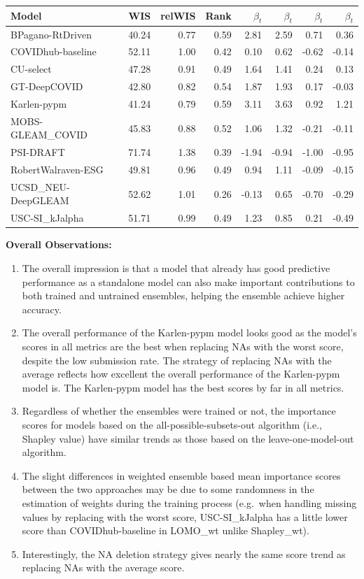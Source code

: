 \documentclass[
]{article}
\begin{document}
\begin{tabular}{l|r|r|r|r|r|r|r}
\hline
Model & WIS & relWIS & Rank & $\beta_t$ & $\beta_t$ & $\beta_t$ & $\beta_t$\\
\hline
BPagano-RtDriven & 40.24 & 0.77 & 0.59 & 2.81 & 2.59 & 0.71 & 0.36\\
\hline
COVIDhub-baseline & 52.11 & 1.00 & 0.42 & 0.10 & 0.62 & -0.62 & -0.14\\
\hline
CU-select & 47.28 & 0.91 & 0.49 & 1.64 & 1.41 & 0.24 & 0.13\\
\hline
GT-DeepCOVID & 42.80 & 0.82 & 0.54 & 1.87 & 1.93 & 0.17 & -0.03\\
\hline
Karlen-pypm & 41.24 & 0.79 & 0.59 & 3.11 & 3.63 & 0.92 & 1.21\\
\hline
MOBS-GLEAM_COVID & 45.83 & 0.88 & 0.52 & 1.06 & 1.32 & -0.21 & -0.11\\
\hline
PSI-DRAFT & 71.74 & 1.38 & 0.39 & -1.94 & -0.94 & -1.00 & -0.95\\
\hline
RobertWalraven-ESG & 49.81 & 0.96 & 0.49 & 0.94 & 1.11 & -0.09 & -0.15\\
\hline
UCSD_NEU-DeepGLEAM & 52.62 & 1.01 & 0.26 & -0.13 & 0.65 & -0.70 & -0.29\\
\hline
USC-SI_kJalpha & 51.71 & 0.99 & 0.49 & 1.23 & 0.85 & 0.21 & -0.49\\
\hline
\end{tabular}

\textbf{Overall Observations:}

\begin{enumerate}
\def\labelenumi{\arabic{enumi})}
\item
  The overall impression is that a model that already has good
  predictive performance as a standalone model can also make important
  contributions to both trained and untrained ensembles, helping the
  ensemble achieve higher accuracy.
\item
  The overall performance of the Karlen-pypm model looks good as the
  model's scores in all metrics are the best when replacing NAs with the
  worst score, despite the low submission rate. The strategy of
  replacing NAs with the average reflects how excellent the overall
  performance of the Karlen-pypm model is. The Karlen-pypm model has the
  best scores by far in all metrics.
\item
  Regardless of whether the ensembles were trained or not, the
  importance scores for models based on the all-possible-subsets-out
  algorithm (i.e., Shapley value) have similar trends as those based on
  the leave-one-model-out algorithm.
\item
  The slight differences in weighted ensemble based mean importance
  scores between the two approaches may be due to some randomness in the
  estimation of weights during the training process (e.g.~when handling
  missing values by replacing with the worst score, USC-SI\_kJalpha has
  a little lower score than COVIDhub-baseline in LOMO\_wt unlike
  Shapley\_wt).
\item
  Interestingly, the NA deletion strategy gives nearly the same score
  trend as replacing NAs with the average score.
\end{enumerate}

\newpage
\end{document}
